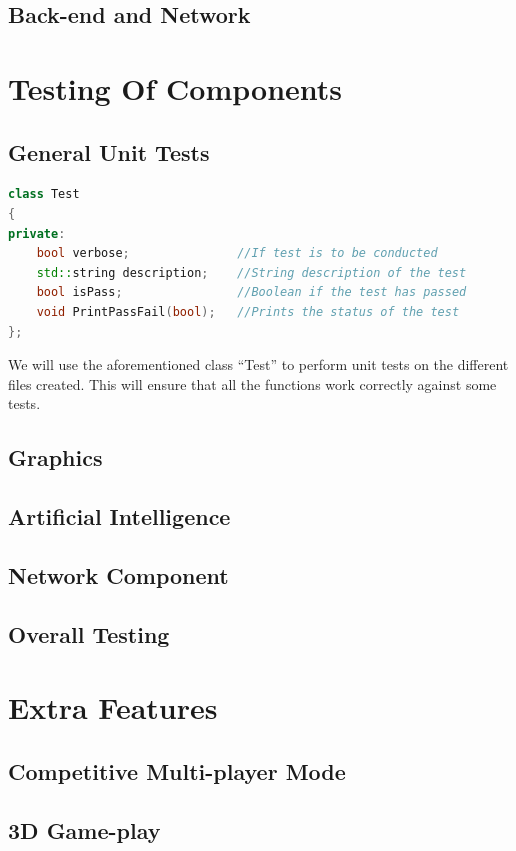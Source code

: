 \documentclass{article}
\begin{document}
			\subsection{Back-end and Network}
	\section{Testing Of Components}
			\subsection{General Unit Tests}
				\begin{lstlisting}[language=C++, caption={Class Parameters for Test}]
class Test
{
private:
	bool verbose;               //If test is to be conducted
	std::string description;    //String description of the test
	bool isPass;                //Boolean if the test has passed 
	void PrintPassFail(bool);   //Prints the status of the test
};
				\end{lstlisting}

				We will use the aforementioned class ``Test'' to perform unit tests on the different files created. This will ensure that all the functions work correctly against some tests.

			\subsection{Graphics}
			\subsection{Artificial Intelligence}
			\subsection{Network Component}
			\subsection{Overall Testing}

	\section{Extra Features}
		\subsection{Competitive Multi-player Mode}
		\subsection{3D Game-play}
\end{document}

